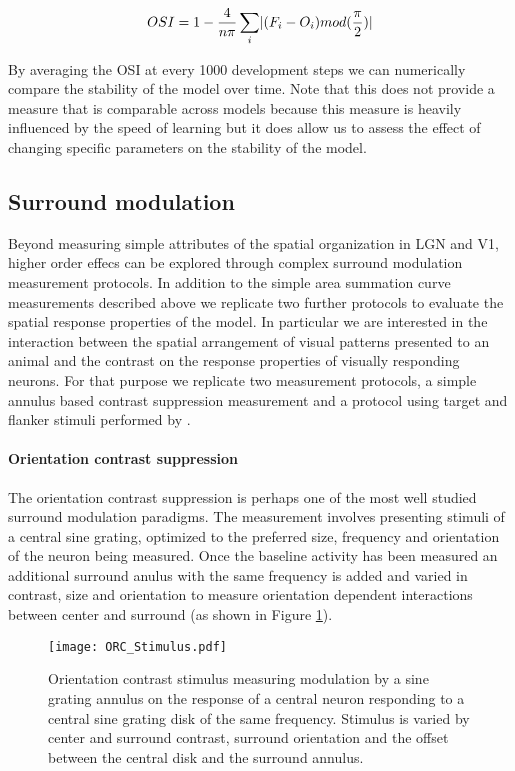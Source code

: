 \begin{equation}
  OSI = 1 - \frac{4}{n\pi} \sum_{i}\lvert(F_{i}-O_{i})mod(\frac{\pi}{2})\rvert
\end{equation}

By averaging the OSI at every 1000 development steps we can
numerically compare the stability of the model over time. Note that
this does not provide a measure that is comparable across models
because this measure is heavily influenced by the speed of learning
but it does allow us to assess the effect of changing specific
parameters on the stability of the model.

\subsection{Surround modulation}

Beyond measuring simple attributes of the spatial organization in LGN
and V1, higher order effecs can be explored through complex surround
modulation measurement protocols. In addition to the simple area
summation curve measurements described above we replicate two further
protocols to evaluate the spatial response properties of the model.
In particular we are interested in the interaction between the spatial
arrangement of visual patterns presented to an animal and the contrast
on the response properties of visually responding neurons. For that
purpose we replicate two measurement protocols, a simple annulus based
contrast suppression measurement \cite{Jones2002} and a protocol using
target and flanker stimuli performed by \cite{Kapadia1995}.

\paragraph{Orientation contrast suppression}

The orientation contrast suppression is perhaps one of the most well
studied surround modulation paradigms. The measurement involves
presenting stimuli of a central sine grating, optimized to the
preferred size, frequency and orientation of the neuron being
measured. Once the baseline activity has been measured an additional
surround anulus with the same frequency is added and varied in
contrast, size and orientation to measure orientation dependent
interactions between center and surround (as shown in Figure
\ref{ORC_Stimulus}).

\begin{figure}
	\centering
        \texttt{[image: ORC\_Stimulus.pdf]}
	\caption{Orientation contrast stimulus measuring modulation by a
      sine grating annulus on the response of a central neuron
      responding to a central sine grating disk of the same frequency.
      Stimulus is varied by center and surround contrast, surround
      orientation and the offset between the central disk and the
      surround annulus.}
	\label{ORC_Stimulus}
\end{figure}

